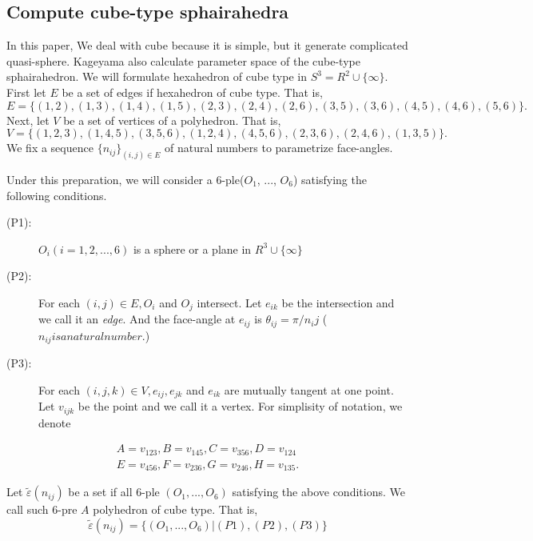 \documentclass[dvipdfmx]{interact}
\theoremstyle{plain}%
\theoremstyle{definition}
\theoremstyle{remark}
\theoremstyle{problemstyle}
\begin{document}

\subsection{Compute cube-type sphairahedra}
In this paper, We deal with cube because it is simple, but it generate
complicated quasi-sphere.
Kageyama also calculate parameter space of the cube-type sphairahedron\cite{kageyama}.
We will formulate hexahedron of cube type in $S^3 = R^2 \cup \{\infty\}$.
First let $E$ be a set of edges if hexahedron of cube type. That is,
$$
E = \{(1, 2), (1, 3), (1, 4), (1, 5), (2, 3), (2, 4), (2, 6), (3, 5),
(3, 6), (4, 5), (4, 6), (5, 6)\}.
$$
Next, let $V$ be a set of vertices of a polyhedron. That is,
$$
V = \{(1, 2, 3), (1, 4, 5), (3, 5, 6), (1, 2, 4), (4, 5, 6), (2, 3, 6),
(2, 4, 6), (1, 3, 5)\}.
$$
We fix a sequence $\{n_{ij}\}_{(i,j) \in E}$ of natural numbers to
parametrize face-angles.

Under this preparation, we will consider a 6-ple($O_1$, ..., $O_6$)
satisfying the following conditions.

\begin{description}
 \item[(P1):] $O_i(i = 1, 2, ..., 6)$ is a sphere or a plane in $R^3
            \cup \{\infty\}$
 \item[(P2):] For each $(i, j) \in E, O_i$ and $O_j$ intersect. Let
            $e_{ik}$ be the intersection and we call it an
            \textit{edge}. And the face-angle at $e_{ij}$ is
            $\theta_{ij} = \pi/n_ij$ ($n_{ij} is a natural number.$)
 \item[(P3):] For each $(i, j, k) \in V, e_{ij}, e_{jk}$ and $e_{ik}$
            are mutually tangent at one point. Let $v_{ijk}$ be 
            the point and we call it a vertex. For simplisity of
            notation, we denote
\end{description}
\begin{eqnarray*}
A = v_{123}, B=v_{145}, C = v_{356}, D = v_{124}\\
E = v_{456}, F=v_{236}, G = v_{246}, H = v_{135}.
\end{eqnarray*}

Let $\tilde\varepsilon(n_{ij})$ be a set if all 6-ple $(O_1, ..., O_6)$
satisfying the above conditions. We call such 6-pre $A$ polyhedron of
cube type. That is,
$$
\tilde\varepsilon(n_{ij}) = \{(O_1, ..., O_6) | (P1), (P2), (P3)\}
$$
\end{document}
